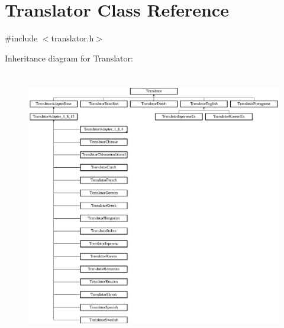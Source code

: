 \hypertarget{class_translator}{}\section{Translator Class Reference}
\label{class_translator}


{\ttfamily \#include $<$translator.\+h$>$}

Inheritance diagram for Translator\+:\begin{figure}[H]
\begin{center}
\leavevmode
\includegraphics[height=11.955056cm]{class_translator}
\end{center}
\end{figure}
